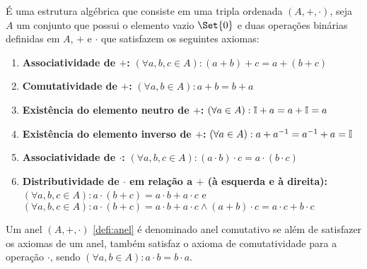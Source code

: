 \documentclass[../../main]{subfiles}
\begin{document}
    \begin{defi}[Anel]\label{defi:anel}
        É uma estrutura algébrica que consiste em uma tripla ordenada $(A,+,\cdot)$, seja $A$ um conjunto que possui o elemento vazio $\Set{0}$ e duas operações binárias definidas em $A$, $+$ e $\cdot$ que satisfazem os seguintes axiomas:

        \begin{enumerate}
            \item \textbf{Associatividade de $+$:} $(\forall a,b,c \in A): (a+b)+c=a+(b+c)$

            \item \textbf{Comutatividade de $+$:} $(\forall a,b \in A): a+b=b+a$

            \item \textbf{Existência do elemento neutro de $+$:} $(\forall a \in A): \mathbb{I}+a=a+\mathbb{I}=a$

            \item \textbf{Existência do elemento inverso de $+$:} $(\forall a \in A): a+a^{-1}=a^{-1}+a=\mathbb{I}$
            \item \textbf{Associatividade de $\cdot$:} $(\forall a,b,c \in A): (a\cdot b)\cdot c=a\cdot (b\cdot c)$

            \item \textbf{Distributividade de $\cdot$ em relação a $+$ (à esquerda e à direita):} $(\forall a,b,c \in A): a\cdot (b+c)=a\cdot b+a\cdot c$ e $(\forall a,b,c \in A): a \cdot (b+c)=a \cdot b+a \cdot c \wedge (a+b)\cdot c=a\cdot c+b\cdot c$
        \end{enumerate}
    \end{defi}

    \begin{defi}\label{defi:anel-comutativo}
        Um anel $(A,+,\cdot)$ \ref{defi:anel} é denominado anel comutativo se além de satisfazer os axiomas de um anel, também satisfaz o axioma de comutatividade para a operação $\cdot$, sendo $(\forall a,b \in A): a\cdot b=b\cdot a$.
    \end{defi}
\end{document}
